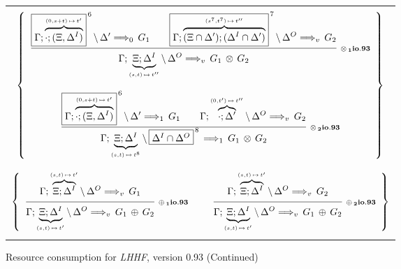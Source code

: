\clearpage
\begin{figure}[t]
  \begin{center}
    \leavevmode

    \begin{tabular}{|c|}
      \hline \\
      $\left\{
        \begin{array}{c}
          \ruleII
            {\ioIXd
              {\fb{\G;\ob{\cdot;(\X,\D^I)}{0,s+t}{t'}}{6}}
              {\D'}{G_1}{0}}
            {\ioIXd
              {\fb{\G;\ob{(\X \cap \D');(\D^I \cap \D')}{s^7,t^7}{t''}}{7}}
              {\D^O}{G_2}{v}}
            {\ioIXd
              {\G;\ub{\X;\D^I}{s,t}{t''}}
              {\D^O}{G_1 \Times G_2}{v}}
            {\Times_1 io.93}
        \\ \\
          \ruleII
            {\ioIXd
              {\fb{\G;\ob{\cdot;(\X,\D^I)}{0,s+t}{t'}}{6}}
              {\D'}{G_1}{1}}
            {\ioIXd
              {\G;\ob{\cdot;\D'}{0,t'}{t''}}
              {\D^O}{G_2}{v}}
            {\ioIXd
              {\G;\ub{\X;\D^I}{s,t}{t^8}}
              {\fb{\D^I \cap \D^O}{8}}{G_1 \Times G_2}{1}}
            {\Times_2 io.93}
        \end{array}
      \right\}$

      \\ \\ \\
      $\left\{
        \begin{array}{ccc}
          \ruleI
            {\ioIXd
              {\G;\ob{\X;\D^I}{s,t}{t'}}
              {\D^O}{G_1}{v}}
            {\ioIXd
              {\G;\ub{\X;\D^I}{s,t}{t'}}
              {\D^O}{G_1 \Plus G_2}{v}}
            {\Plus_1 io.93}
        &
          \hspace{0.5em}
        &
          \ruleI
            {\ioIXd
              {\G;\ob{\X;\D^I}{s,t}{t'}}
              {\D^O}{G_2}{v}}
            {\ioIXd
              {\G;\ub{\X;\D^I}{s,t}{t'}}
              {\D^O}{G_1 \Plus G_2}{v}}
            {\Plus_2 io.93}
        \end{array}
      \right\}$

      \\ \\
      \hline
    \end{tabular}

    \caption{Resource consumption for {\em LHHF}, version 0.93 (Continued)}
    \label{fig:RC_IXd2}
  \end{center}
\end{figure}

